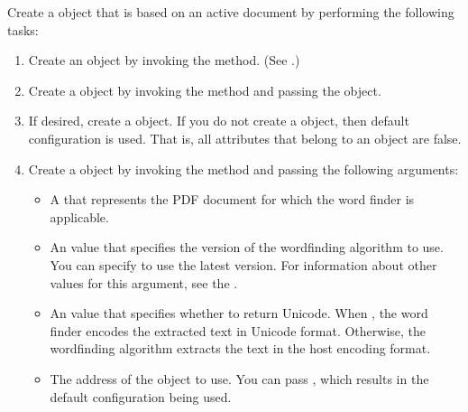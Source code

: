 \documentclass[letterpaper,12pt,english,openany,oneside]{sphinxmanual}
\begin{document}
Create a  object that is based on an active document by performing the following tasks:
\begin{enumerate}
%
\item {} 
Create an  object by invoking the  method. (See .)

\item {} 
Create a  object by invoking the  method and passing the  object.

\item {} 
If desired, create a  object. If you do not create a  object, then default configuration is used. That is, all attributes that belong to an  object are false.

\item {} 
Create a  object by invoking the  method and passing the following arguments:
\begin{itemize}
\item {} 
A  that represents the PDF document for which the word finder is applicable.

\item {} 
An  value that specifies the version of the word\sphinxhyphen{}finding algorithm to use. You can specify  to use the latest version. For information about other values for this argument, see the .

\item {} 
An  value that specifies whether to return Unicode. When , the word finder encodes the extracted text in Unicode format. Otherwise, the word\sphinxhyphen{}finding algorithm extracts the text in the host encoding format.

\item {} 
The address of the  object to use. You can pass , which results in the default configuration being used.

\end{itemize}

\end{enumerate}
\end{document}
